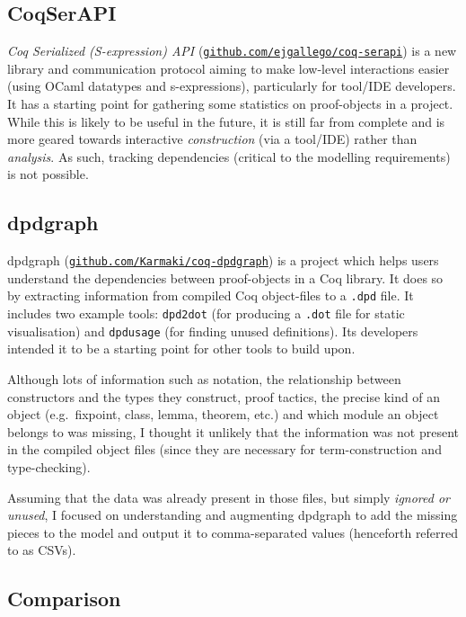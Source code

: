 \subsection{CoqSerAPI}

\emph{Coq Serialized (S-expression) API}
(\href{http://github.com/ejgallego/coq-serapi}{\texttt{github.com/ejgallego/coq-serapi}})
is a new library and communication protocol aiming to make low-level
interactions easier (using OCaml datatypes and s-expressions), particularly for
tool/IDE developers. It has a starting point for gathering some statistics on
proof-objects in a project. While this is likely to be useful in the future, it
is still far from complete and is more geared towards interactive
\emph{construction} (via a tool/IDE) rather than \emph{analysis}. As such,
tracking dependencies (critical to the modelling requirements) is not possible.

\subsection{dpdgraph}

dpdgraph
(\href{http://github.com/Karmaki/coq-dpdgraph}{\texttt{github.com/Karmaki/coq-dpdgraph}})
is a project which helps users understand the dependencies between proof-objects
in a Coq library. It does so by extracting information from compiled Coq
object-files to a \texttt{.dpd} file. It includes two example tools:
\texttt{dpd2dot} (for producing a \texttt{.dot} file for static visualisation)
and \texttt{dpdusage} (for finding unused definitions). Its developers intended
it to be a starting point for other tools to build upon.

Although lots of information such as notation, the relationship between
constructors and the types they construct, proof tactics, the precise kind of an
object (e.g.\  fixpoint, class, lemma, theorem, etc.) and which module an object
belongs to was missing, I thought it unlikely that the information was not
present in the compiled object files (since they are necessary for
term-construction and type-checking).

Assuming that the data was already present in those files, but simply
\emph{ignored or unused}, I focused on understanding and augmenting dpdgraph to
add the missing pieces to the model and output it to comma-separated values
(henceforth referred to as CSVs).

\subsection{Comparison}\label{subsec:comparison}

